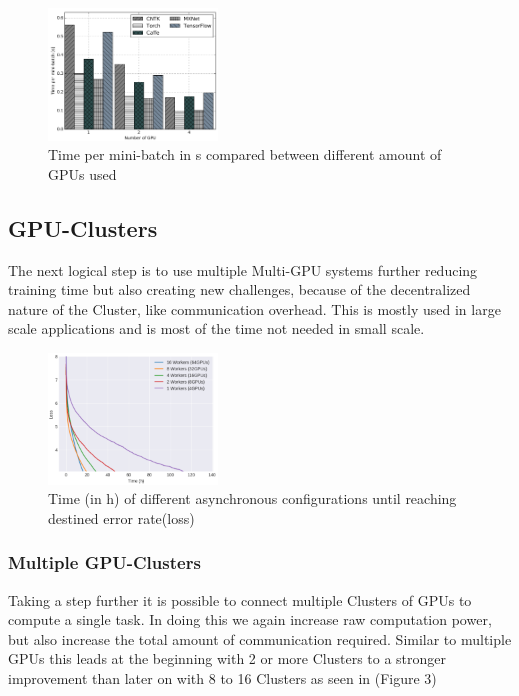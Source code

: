 \documentclass[conference]{IEEEtran}
\begin{document}
\begin{figure}
\centering
\includegraphics[width=0.4\textwidth]{a.png}

\caption{Time per mini-batch in s compared between different amount of GPUs used\cite{shi2016benchmarking}}
\label{fig_m_gpu}
\end{figure}

\subsection{GPU-Clusters}

The next logical step is to use multiple Multi-GPU systems further reducing training time but also creating new challenges, because of the decentralized nature of the Cluster, like communication overhead.  This is mostly used in large scale applications and is most of the time not needed in small scale.

\begin{figure}
\centering
\includegraphics[width=0.4\textwidth]{gpu_cluster_perf_win.png}
\caption{Time (in h) of different asynchronous configurations until reaching destined error rate(loss)\cite{sastre2017scalability}}
\label{fig_cl_gpus}
\end{figure}

\subsubsection{Multiple GPU-Clusters}
Taking a step further it is possible to connect multiple Clusters of GPUs to compute a single task. In doing this we again increase raw computation power, but also increase the total amount of communication required. Similar to multiple GPUs this leads at the beginning with 2 or more Clusters to a stronger improvement than later on with 8 to 16 Clusters as seen in (Figure 3)
\end{document}
